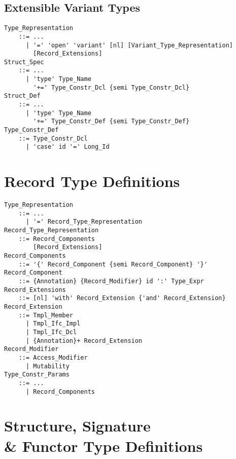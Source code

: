\subsection{Extensible Variant Types}
\label{sec:extensible-variant-types}

\grammar\begin{lstlisting}
Type_Representation 
    ::= ...
      | '=' 'open' 'variant' [nl] [Variant_Type_Representation] 
        [Record_Extensions]
Struct_Spec
    ::= ...
      | 'type' Type_Name 
        '+=' Type_Constr_Dcl {semi Type_Constr_Dcl}
Struct_Def
    ::= ...
      | 'type' Type_Name
        '+=' Type_Constr_Def {semi Type_Constr_Def}
Type_Constr_Def
    ::= Type_Constr_Dcl 
      | 'case' id '=' Long_Id
\end{lstlisting}






\section{Record Type Definitions}
\label{sec:record-types}

\grammar\begin{lstlisting}
Type_Representation 
    ::= ...
      | '=' Record_Type_Representation
Record_Type_Representation 
    ::= Record_Components 
        [Record_Extensions]
Record_Components 
    ::= '{' Record_Component {semi Record_Component} '}'
Record_Component 
    ::= {Annotation} {Record_Modifier} id ':' Type_Expr
Record_Extensions 
    ::= [nl] 'with' Record_Extension {'and' Record_Extension}
Record_Extension 
    ::= Tmpl_Member
      | Tmpl_Ifc_Impl
      | Tmpl_Ifc_Dcl
      | {Annotation}+ Record_Extension
Record_Modifier 
    ::= Access_Modifier 
      | Mutability
Type_Constr_Params
    ::= ...
      | Record_Components
\end{lstlisting}





\section[Structure, Signature \& Functor Type Definitions]{Structure, Signature \\\& Functor Type Definitions}
\label{sec:struct-types}

